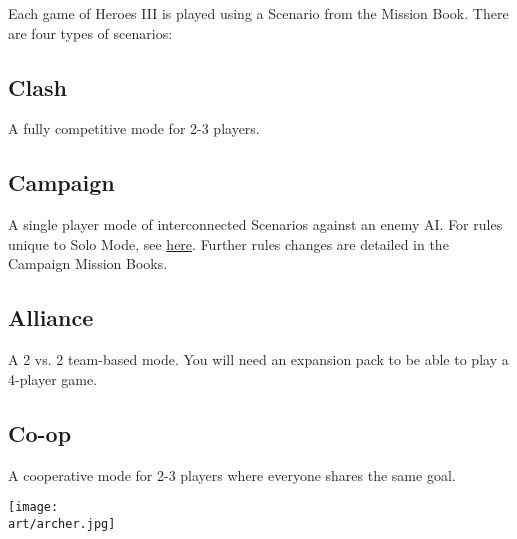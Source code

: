 
\begin{multicols*}{2}

Each game of Heroes III is played using a Scenario from the Mission Book.
There are four types of scenarios:

\subsection*{Clash}
A fully competitive mode for 2-3 players.

\subsection*{Campaign}
A single player mode of interconnected Scenarios against an enemy AI.
For rules unique to Solo Mode, see \hyperlink{AIrules}{here}.
Further rules changes are detailed in the Campaign Mission Books.

\subsection*{Alliance}
A 2 vs.
2 team-based mode.
You will need an expansion pack to be able to play a 4-player game.

\subsection*{Co-op}
A cooperative mode for 2-3 players where everyone shares the same goal.

\vspace*{\fill}

\columnbreak

\texttt{[image: \\art/archer.jpg]}

\end{multicols*}
